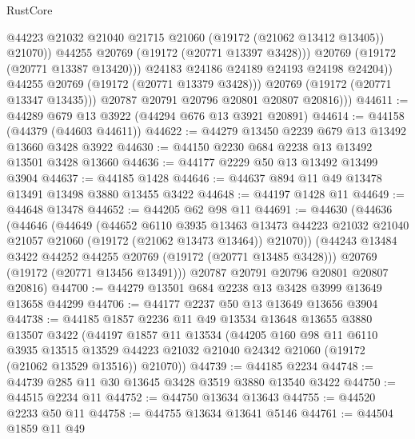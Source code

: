 \begin{lexlean}{RustCore}
\begin{coremodule}
                          @44223
                          @21032
                          @21040
                          @21715
                          @21060
                          (@19172 (@21062 @13412 @13405))
                          @21070))
                      @44255
                      @20769
                      (@19172 (@20771 @13397 @3428)))
                    @20769
                    (@19172 (@20771 @13387 @13420)))
                  @24183
                  @24186
                  @24189
                  @24193
                  @24198
                  @24204))
              @44255
              @20769
              (@19172 (@20771 @13379 @3428)))
            @20769
            (@19172 (@20771 @13347 @13435)))
          @20787
          @20791
          @20796
          @20801
          @20807
          @20816)))
@44611 := @44289 @679 @13 @3922 (@44294 @676 @13 @3921 @20891)
@44614 := @44158 (@44379 (@44603 @44611))
@44622 := @44279 @13450 @2239 @679 @13 @13492 @13660 @3428 @3922
@44630 := @44150 @2230 @684 @2238 @13 @13492 @13501 @3428 @13660
@44636 := @44177 @2229 @50 @13 @13492 @13499 @3904
@44637 := @44185 @1428
@44646 := @44637 @894 @11 @49 @13478 @13491 @13498 @3880 @13455 @3422
@44648 := @44197 @1428 @11
@44649 := @44648 @13478
@44652 := @44205 @62 @98 @11
@44691 := @44630
    (@44636
      (@44646
        (@44649
          (@44652
            @6110
            @3935
            @13463
            @13473
            @44223
            @21032
            @21040
            @21057
            @21060
            (@19172 (@21062 @13473 @13464))
            @21070))
        (@44243 @13484 @3422 @44252 @44255 @20769 (@19172 (@20771 @13485 @3428)))
        @20769
        (@19172 (@20771 @13456 @13491)))
      @20787
      @20791
      @20796
      @20801
      @20807
      @20816)
@44700 := @44279 @13501 @684 @2238 @13 @3428 @3999 @13649 @13658 @44299
@44706 := @44177 @2237 @50 @13 @13649 @13656 @3904
@44738 := @44185
    @1857
    @2236
    @11
    @49
    @13534
    @13648
    @13655
    @3880
    @13507
    @3422
    (@44197
      @1857
      @11
      @13534
      (@44205
        @160
        @98
        @11
        @6110
        @3935
        @13515
        @13529
        @44223
        @21032
        @21040
        @24342
        @21060
        (@19172 (@21062 @13529 @13516))
        @21070))
@44739 := @44185 @2234
@44748 := @44739 @285 @11 @30 @13645 @3428 @3519 @3880 @13540 @3422
@44750 := @44515 @2234 @11
@44752 := @44750 @13634 @13643
@44755 := @44520 @2233 @50 @11
@44758 := @44755 @13634 @13641 @5146
@44761 := @44504 @1859 @11 @49

\end{coremodule}
\end{lexlean}
